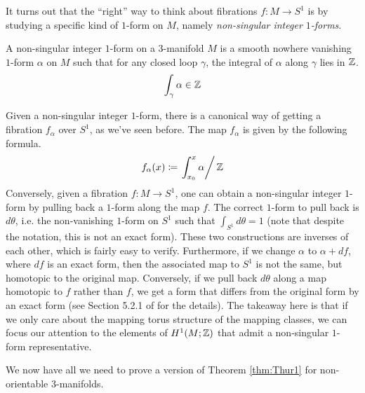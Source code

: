 It turns out that the ``right'' way to think about fibrations $f: M \to S^1$ is by studying a
specific kind of $1$-form on $M$, namely \emph{non-singular integer $1$-forms}.

\begin{defn}
  A non-singular integer $1$-form on a $3$-manifold $M$ is a smooth nowhere vanishing $1$-form $\alpha$ on $M$
  such that for any closed loop $\gamma$, the integral of $\alpha$ along $\gamma$ lies in $\mathbb{Z}$.
  \begin{align*}
    \int_{\gamma} \alpha \in \mathbb{Z}
  \end{align*}
\end{defn}

Given a non-singular integer $1$-form, there is a canonical way of getting a fibration $f_{\alpha}$
over $S^1$, as we've seen before. The map $f_{\alpha}$ is given by the following formula.
\begin{align*}
  f_{\alpha}(x) \coloneqq \left. \int_{x_0}^x \alpha \right/ \mathbb{Z}
\end{align*}
Conversely, given a fibration $f: M \to S^1$, one can obtain a non-singular integer $1$-form by
pulling back a $1$-form along the map $f$. The correct $1$-form to pull back is $d\theta$, i.e.
the non-vanishing $1$-form on $S^1$ such that $\int_{S^1} d\theta = 1$ (note that despite the
notation, this is not an exact form). These two constructions are inverses of each other, which is
fairly easy to verify. Furthermore, if we change $\alpha$ to $\alpha + df$, where $df$ is an exact
form, then the associated map to $S^1$ is not the same, but homotopic to the original
map. Conversely, if we pull back $d\theta$ along a map homotopic to $f$ rather than $f$, we get a
form that differs from the original form by an exact form (see Section 5.2.1 of
\cite{calegari2007foliations} for the details). The takeaway here is that if we only care about the
mapping torus structure of the mapping classes, we can focus our attention to the elements of
$H^1(M; \mathbb{Z})$ that admit a non-singular $1$-form representative.

We now have all we need to prove a version of Theorem \ref{thm:Thur1} for non-orientable
$3$-manifolds.

